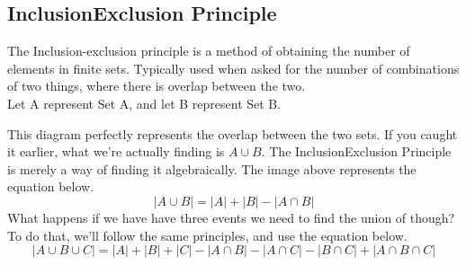     \subsection{Inclusion\textemdash Exclusion Principle}
    The Inclusion-exclusion principle is a method of obtaining the number of elements in finite sets.
    Typically used when asked for the number of combinations of two things, where there is overlap between the two.\\
    Let A represent Set A, and let B represent Set B.
    \begin{center}
    \end{center}
    This diagram perfectly represents the overlap between the two sets.
    If you caught it earlier, what we're actually finding is $A\cup B$.
    The Inclusion\textemdash Exclusion Principle is merely a way of finding it algebraically.
    The image above represents the equation below.
    \begin{equation*}
        |A\cup B| = |A| + |B| - |A\cap B|
    \end{equation*}
    What happens if we have have three events we need to find the union of though?
    To do that, we'll follow the same principles, and use the equation below.
    \begin{equation*}
        |A\cup B\cup C| = |A| + |B| + |C| - |A\cap B| - |A\cap C| - |B\cap C| + |A\cap B\cap C|
    \end{equation*}
